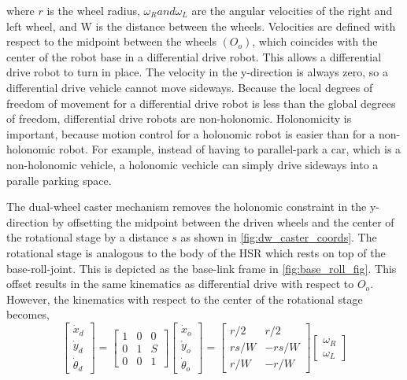\documentclass[12pt]{article}
\begin{document}
            where $r$ is the wheel radius, $\omega_{R} and \omega_{L}$ are the angular velocities of the right and left wheel, and W is the distance between the wheels. Velocities are defined with respect to the midpoint between the wheels $(O_o)$, which coincides with the center of the robot base in a differential drive robot. This allows a differential drive robot to turn in place. The velocity in the y-direction is always zero, so a differential drive vehicle cannot move sideways. Because the local degrees of freedom of movement for a differential drive robot is less than the global degrees of freedom, differential drive robots are non-holonomic. Holonomicity is important, because motion control for a holonomic robot is easier than for a non-holonomic robot.\cite{newman_c18_2017} For example, instead of having to parallel-park a car, which is a non-holonomic vehicle, a holonomic vechicle can simply drive sideways into a paralle parking space.

            \par The dual-wheel caster mechanism removes the holonomic constraint in the y-direction by offsetting the midpoint between the driven wheels and the center of the rotational stage by a distance $s$ as shown in \cref{fig:dw_caster_coords}. The rotational stage is analogous to the body of the HSR which rests on top of the base-roll-joint. This is depicted as the base-link frame in \cref{fig:base_roll_fig}. This offset results in the same kinematics as differential drive with respect to $O_{o}$. However, the kinematics with respect to the center of the rotational stage becomes,
            \begin{equation}
                \begin{bmatrix}
                    \dot{x}_{d}\\
                    \dot{y}_{d}\\
                    \dot{\theta}_{d}
                \end{bmatrix}
                =
                \begin{bmatrix}
                    1 & 0 & 0\\
                    0 & 1 & S\\
                    0 & 0 & 1
                \end{bmatrix}
                \begin{bmatrix}
                    \dot{x}_{o}\\
                    \dot{y}_{o}\\
                    \dot{\theta}_{o}
                \end{bmatrix}
                =
                \begin{bmatrix}
                    r/2 & r/2\\
                    rs/W & -rs/W\\
                    r/W & -r/W
                \end{bmatrix}
                \begin{bmatrix}
                    \omega_{R}\\
                    \omega_{L}
                \end{bmatrix}
            \end{equation}
\end{document}
